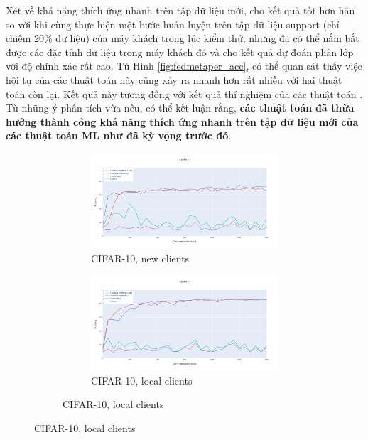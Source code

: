 Xét về khả năng thích ứng nhanh trên tập dữ liệu mới,  cho kết quả tốt hơn hẳn so với  khi cùng thực hiện một bước huấn luyện trên tập dữ liệu support (chỉ chiếm 20\% dữ liệu) của máy khách trong lúc kiểm thử, nhưng đã có thể nắm bắt được các đặc tính dữ liệu trong máy khách đó và cho kết quả dự đoán phân lớp với độ chính xác rất cao. Từ Hình \ref{fig:fedmetaper_acc}, có thể quan sát thấy việc hội tụ của các thuật toán này cũng xảy ra nhanh hơn rất nhiều với hai thuật toán còn lại. Kết quả này tương đồng với kết quả thí nghiệm của các thuật toán . Từ những ý phân tích vừa nêu, có thể kết luận rằng, \textbf{các thuật toán}  \textbf{đã thừa hưởng thành công khả năng thích ứng nhanh trên tập dữ liệu mới của các thuật toán ML như đã kỳ vọng trước đó}.
\clearpage
\begin{figure}
    \centering
    \begin{subfigure}{\textwidth}
        \centering
        \begin{subfigure}{.5\textwidth}
            \centering
            \includegraphics[width=\linewidth]{./images/cifar_per_new.png}
            \caption{CIFAR-10, new clients}
            \label{fig:cifar_per_new}
        \end{subfigure}%
        \begin{subfigure}{.5\textwidth}
            \centering
            \includegraphics[width=\linewidth]{./images/cifar_per_old.png}
            \caption{CIFAR-10, local clients}
            \label{fig:cifar_per_old}
        \end{subfigure}
    \end{subfigure}


\end{figure}
